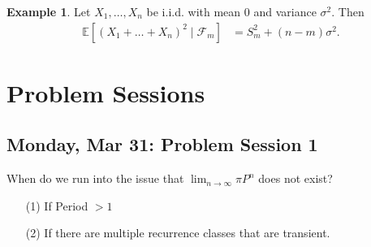 \documentclass[10pt, oneside]{article}
\newcommand{\bbE}{\mathbb{E}}
\theoremstyle{definition}
\newtheorem{exmp}{Example}[section]
\begin{document}
\begin{exmp}
    Let $X_1, \dots, X_n$ be i.i.d. with mean $0$ and variance $\sigma^2.$ Then 
    \begin{align*}
        \bbE[(X_1 + \dots + X_n)^2 \mid \mathcal{F}_m] &= S_m^2 + (n-m)\sigma^2.
    \end{align*}
\end{exmp}













\newpage
\section{Problem Sessions}
\subsection{Monday, Mar 31: Problem Session 1}
When do we run into the issue that $\lim_{n\to \infty}\pi P^n$ does not exist? 
\begin{enumerate}
    \item[(1)] If Period $> 1$
    \item[(2)] If there are multiple recurrence classes that are transient.
\end{enumerate}
\end{document}
